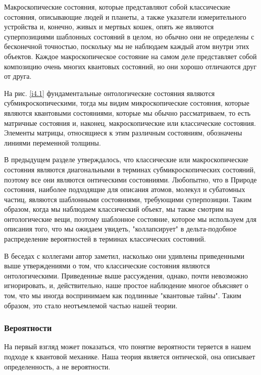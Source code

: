 \documentclass[main.tex]{subfiles}
\begin{document}
Макроскопические состояния, которые представляют собой классические состояния, описывающие людей и планеты, а также указатели измерительного устройства и, конечно, живых и мертвых кошек, опять же являются суперпозициями шаблонных состояний в целом, но обычно они не определены с бесконечной точностью, поскольку мы не наблюдаем каждый атом внутри этих объектов. Каждое макроскопическое состояние на самом деле представляет собой композицию очень многих квантовых состояний, но они хорошо отличаются друг от друга.

На рис. \ref{i4.1} фундаментальные онтологические состояния являются субмикроскопическими, тогда мы видим микроскопические состояния, которые являются квантовыми состояниями, которые мы обычно рассматриваем, то есть матричные состояния и, наконец, макроскопические или классические состояния. Элементы матрицы, относящиеся к этим различным состояниям, обозначены линиями переменной толщины.

В предыдущем разделе утверждалось, что классические или макроскопические состояния являются диагональными в терминах субмикроскопических состояний, поэтому все они являются онтическими состояниями. Любопытно, что в Природе состояния, наиболее подходящие для описания атомов, молекул и субатомных частиц, являются шаблонными состояниями, требующими суперпозиции. Таким образом, когда мы наблюдаем классический объект, мы также смотрим на онтологические вещи, поэтому шаблонное состояние, которое мы используем для описания того, что мы ожидаем увидеть, "коллапсирует" в дельта-подобное распределение вероятностей в терминах классических состояний.

В беседах с коллегами автор заметил, насколько они удивлены приведенными выше утверждениями о том, что классические состояния являются онтологическими. Приведенные выше рассуждения, однако, почти невозможно игнорировать, и, действительно, наше простое наблюдение многое объясняет о том, что мы иногда воспринимаем как подлинные "квантовые тайны". Таким образом, это стало неотъемлемой частью нашей теории.

\subsubsection{Вероятности}\label{ch4.3.2}

На первый взгляд может показаться, что понятие вероятности теряется в нашем подходе к квантовой механике. Наша теория является онтической, она описывает определенность, а не вероятности.
\end{document}

